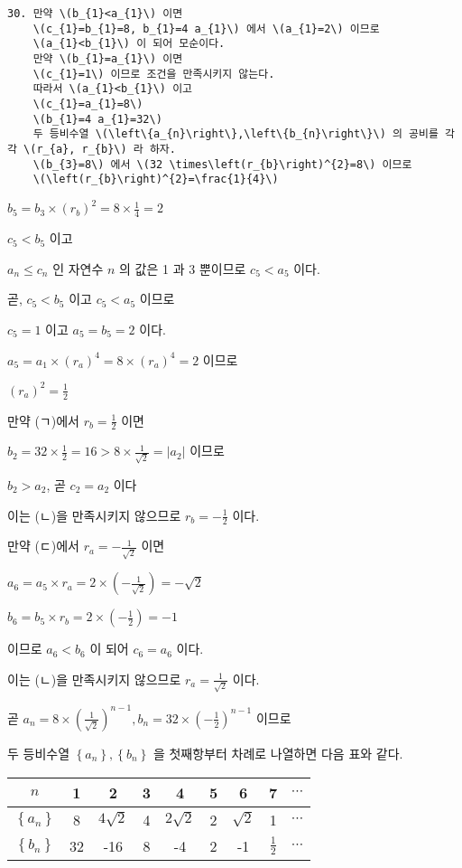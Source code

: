 \documentclass[10pt]{article}
\begin{document}
\begin{verbatim}
30. 만약 \(b_{1}<a_{1}\) 이면
    \(c_{1}=b_{1}=8, b_{1}=4 a_{1}\) 에서 \(a_{1}=2\) 이므로
    \(a_{1}<b_{1}\) 이 되어 모순이다.
    만약 \(b_{1}=a_{1}\) 이면
    \(c_{1}=1\) 이므로 조건을 만족시키지 않는다.
    따라서 \(a_{1}<b_{1}\) 이고
    \(c_{1}=a_{1}=8\)
    \(b_{1}=4 a_{1}=32\)
    두 등비수열 \(\left\{a_{n}\right\},\left\{b_{n}\right\}\) 의 공비를 각각 \(r_{a}, r_{b}\) 라 하자.
    \(b_{3}=8\) 에서 \(32 \times\left(r_{b}\right)^{2}=8\) 이므로
    \(\left(r_{b}\right)^{2}=\frac{1}{4}\)
\end{verbatim}

\(b_{5}=b_{3} \times\left(r_{b}\right)^{2}=8 \times \frac{1}{4}=2\)

\(c_{5}<b_{5}\) 이고

\(a_{n} \leq c_{n}\) 인 자연수 \(n\) 의 값은 1 과 3 뿐이므로 \(c_{5}<a_{5}\) 이다.

곧, \(c_{5}<b_{5}\) 이고 \(c_{5}<a_{5}\) 이므로

\(c_{5}=1\) 이고 \(a_{5}=b_{5}=2\) 이다.

\(a_{5}=a_{1} \times\left(r_{a}\right)^{4}=8 \times\left(r_{a}\right)^{4}=2\) 이므로

\(\left(r_{a}\right)^{2}=\frac{1}{2}\)

만약 (ㄱ)에서 \(r_{b}=\frac{1}{2}\) 이면

\(b_{2}=32 \times \frac{1}{2}=16>8 \times \frac{1}{\sqrt{2}}=\left|a_{2}\right|\) 이므로

\(b_{2}>a_{2}\), 곧 \(c_{2}=a_{2}\) 이다

이는 (ㄴ)을 만족시키지 않으므로 \(r_{b}=-\frac{1}{2}\) 이다.

만약 (ㄷ)에서 \(r_{a}=-\frac{1}{\sqrt{2}}\) 이면

\(a_{6}=a_{5} \times r_{a}=2 \times\left(-\frac{1}{\sqrt{2}}\right)=-\sqrt{2}\)

\(b_{6}=b_{5} \times r_{b}=2 \times\left(-\frac{1}{2}\right)=-1\)

이므로 \(a_{6}<b_{6}\) 이 되어 \(c_{6}=a_{6}\) 이다.

이는 (ㄴ)을 만족시키지 않으므로 \(r_{a}=\frac{1}{\sqrt{2}}\) 이다.

곧 \(a_{n}=8 \times\left(\frac{1}{\sqrt{2}}\right)^{n-1}, b_{n}=32 \times\left(-\frac{1}{2}\right)^{n-1}\) 이므로

두 등비수열 \(\left\{a_{n}\right\},\left\{b_{n}\right\}\) 을 첫째항부터 차례로 나열하면 다음 표와 같다.

\begin{center}
\begin{tabular}{|c|c|c|c|c|c|c|c|c|}
\hline
\(n\) & 1 & 2 & 3 & 4 & 5 & 6 & 7 & \(\cdots\) \\
\hline
\(\left\{a_{n}\right\}\) & 8 & \(4 \sqrt{2}\) & 4 & \(2 \sqrt{2}\) & 2 & \(\sqrt{2}\) & 1 & \(\cdots\) \\
\hline
\(\left\{b_{n}\right\}\) & 32 & -16 & 8 & -4 & 2 & -1 & \(\frac{1}{2}\) & \(\cdots\) \\
\hline
\end{tabular}
\end{center}
\end{document}
